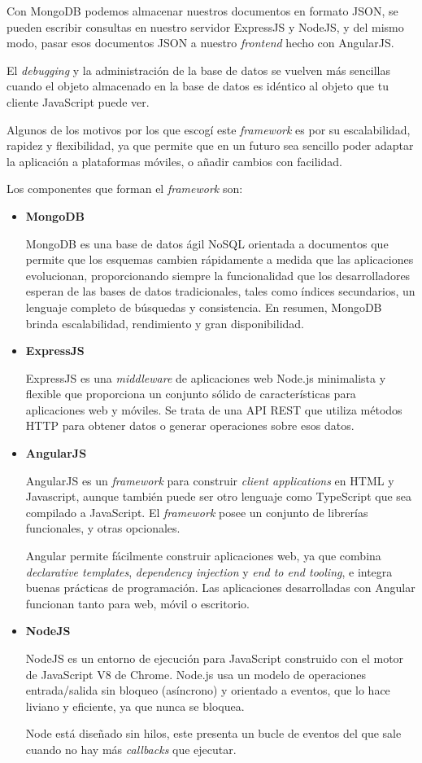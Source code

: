 Con MongoDB podemos almacenar nuestros documentos en formato JSON, se pueden escribir consultas en nuestro servidor ExpressJS y NodeJS, y del mismo modo, pasar esos documentos JSON a nuestro \textit{frontend} hecho con AngularJS.


El \textit{debugging} y la administración de la base de datos se vuelven más sencillas cuando el objeto almacenado en la base de datos es idéntico al objeto que tu cliente JavaScript puede ver\cite{mongodb_mean_stack}.


Algunos de los motivos por los que escogí este \textit{framework} es por su escalabilidad, rapidez y flexibilidad, ya que permite que en un futuro sea sencillo poder adaptar la aplicación a plataformas móviles, o añadir cambios con facilidad.


Los componentes que forman el \textit{framework} son:


\begin{itemize}
\item \textbf{MongoDB} 


MongoDB es una base de datos ágil NoSQL orientada a documentos que permite que los esquemas cambien rápidamente a medida que las aplicaciones evolucionan, proporcionando siempre la funcionalidad que los desarrolladores esperan de las bases de datos tradicionales, tales como índices secundarios, un lenguaje completo de búsquedas y consistencia. En resumen, MongoDB brinda escalabilidad, rendimiento y gran disponibilidad\cite{mongodb_gest_datos}. 
\item \textbf{ExpressJS} 


ExpressJS es una \textit{middleware} de aplicaciones web Node.js minimalista y flexible que proporciona un conjunto sólido de características para aplicaciones web y móviles\cite{express}. Se trata de una API REST que utiliza métodos HTTP para obtener datos o generar operaciones sobre esos datos.
\item \textbf{AngularJS}


AngularJS es un \textit{framework} para construir \textit{client applications} en HTML y Javascript, aunque también puede ser otro lenguaje como TypeScript que sea compilado a JavaScript. El \textit{framework} posee un conjunto de librerías funcionales, y otras opcionales\cite{angular_docs}.


Angular permite fácilmente construir aplicaciones web, ya que combina \textit{declarative templates}, \textit{dependency injection} y \textit{end to end tooling}, e integra buenas prácticas de programación. Las aplicaciones desarrolladas con Angular funcionan tanto para web, móvil o escritorio\cite{angular_arch}. 
\item \textbf{NodeJS}


NodeJS es un entorno de ejecución para JavaScript construido con el motor de JavaScript V8 de Chrome. Node.js usa un modelo de operaciones entrada/salida sin bloqueo (asíncrono) y orientado a eventos, que lo hace liviano y eficiente, ya que nunca se bloquea. 


Node está diseñado sin hilos, este presenta un bucle de eventos del que sale cuando no hay más \textit{callbacks} que ejecutar\cite{node_acerca}.
\end{itemize}


